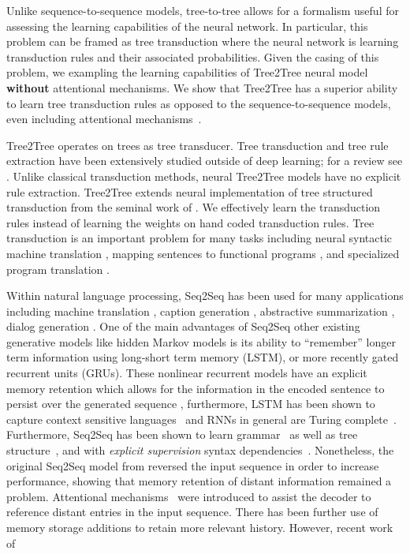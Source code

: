 \documentclass{article}
\newcommand{\jcs}[1]{\noindent{\textcolor{green}{\{{\bf jcs:} {\em #1}\}}}}
\begin{document}
Unlike sequence-to-sequence models, tree-to-tree allows for a formalism useful for assessing the learning capabilities of the neural network. In particular, this problem can be framed as tree transduction where the neural network is learning transduction rules and their associated probabilities. Given the casing of this problem, we exampling the learning capabilities of Tree2Tree neural model {\bf without} attentional mechanisms. We show that Tree2Tree has a superior ability to learn tree transduction rules as opposed to the sequence-to-sequence models, even including attentional mechanisms~\citep{bahdanau2014neural}.

Tree2Tree operates on trees as tree transducer. Tree transduction and tree rule extraction have been extensively studied outside of deep learning; for a review see \citet{comon2007tree}. Unlike classical transduction methods, neural Tree2Tree models have no explicit rule extraction.  
Tree2Tree extends neural implementation of tree structured transduction from the seminal work of \citet{frasconi1998general}. We effectively learn the transduction rules instead of learning the weights on hand coded transduction rules. 
Tree transduction is an important problem for many tasks including neural syntactic machine translation \citep{cowan2008tree,razmara2011application,wang2007chinese}, mapping sentences to functional programs \citep{alvarez2017tree}, and specialized program translation \citep{alur2012streaming}.

Within natural language processing, Seq2Seq has been used for many applications including machine translation \citep{sutskever2014sequence,bahdanau2014neural,vinyals2015show}, caption generation \citep{vinyals2015show}, abstractive summarization \citep{rush2015neural}, dialog generation \citep{vinyals2015neural}. One of the main advantages of Seq2Seq other existing generative models like hidden Markov models is its ability to ``remember'' longer term information using long-short term memory (LSTM), or more recently gated recurrent units (GRUs). These nonlinear recurrent models have an explicit memory retention which allows for the information in the encoded sentence to persist over the generated sequence \citep{lin2016critical}, furthermore, LSTM has been shown to capture context sensitive languages~\citep{gers2001lstm} and RNNs in general are Turing complete~\citep{siegelmann1995computational}. Furthermore, Seq2Seq has been shown to learn grammar~\citep{vinyals2015grammar} as well as tree structure~\citep{bowman2015tree}, and with {\it explicit supervision} syntax dependencies~\citep{linzen2016assessing}. Nonetheless, the original Seq2Seq model from \citet{sutskever2014sequence} reversed the input sequence in order to increase performance, showing that memory retention of distant information remained a problem. Attentional mechanisms~\citep{bahdanau2014neural,luong2015effective} were introduced to assist the decoder to reference distant entries in the input sequence. There has been further use of memory storage additions \citep{sukhbaatar2015end} to retain more relevant history. However, recent work of \citet{bow}
\end{document}
